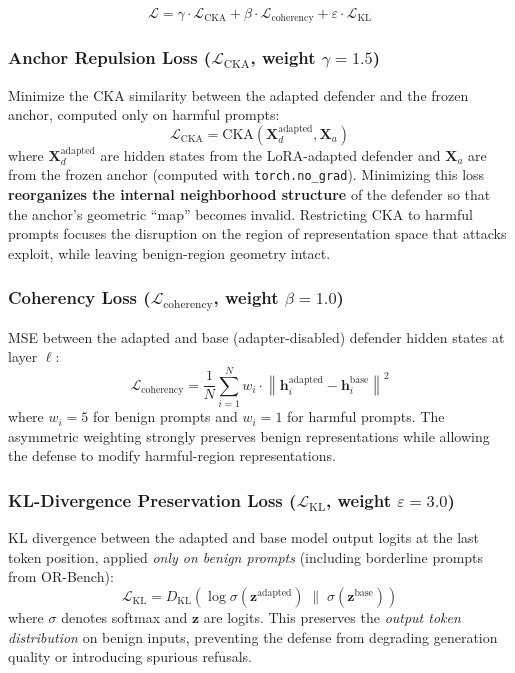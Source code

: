\documentclass[11pt]{article}
\newcommand{\loss}{\mathcal{L}}
\newcommand{\norm}[1]{\left\| #1 \right\|}
\begin{document}
\begin{equation}
    \loss = \gamma \cdot \loss_{\text{CKA}} + \beta \cdot \loss_{\text{coherency}} + \varepsilon \cdot \loss_{\text{KL}}
\end{equation}

\subsubsection{Anchor Repulsion Loss ($\loss_{\text{CKA}}$, weight $\gamma = 1.5$)}

Minimize the CKA similarity between the adapted defender and the frozen anchor, computed only on harmful prompts:
\begin{equation}
    \loss_{\text{CKA}} = \text{CKA}(\mathbf{X}_d^{\text{adapted}}, \mathbf{X}_a)
\end{equation}
where $\mathbf{X}_d^{\text{adapted}}$ are hidden states from the LoRA-adapted defender and $\mathbf{X}_a$ are from the frozen anchor (computed with \texttt{torch.no\_grad}). Minimizing this loss \textbf{reorganizes the internal neighborhood structure} of the defender so that the anchor's geometric ``map'' becomes invalid. Restricting CKA to harmful prompts focuses the disruption on the region of representation space that attacks exploit, while leaving benign-region geometry intact.

\subsubsection{Coherency Loss ($\loss_{\text{coherency}}$, weight $\beta = 1.0$)}

MSE between the adapted and base (adapter-disabled) defender hidden states at layer $\ell$:
\begin{equation}
    \loss_{\text{coherency}} = \frac{1}{N} \sum_{i=1}^{N} w_i \cdot \norm{\mathbf{h}_i^{\text{adapted}} - \mathbf{h}_i^{\text{base}}}^2
\end{equation}
where $w_i = 5$ for benign prompts and $w_i = 1$ for harmful prompts. The asymmetric weighting strongly preserves benign representations while allowing the defense to modify harmful-region representations.

\subsubsection{KL-Divergence Preservation Loss ($\loss_{\text{KL}}$, weight $\varepsilon = 3.0$)}

KL divergence between the adapted and base model output logits at the last token position, applied \emph{only on benign prompts} (including borderline prompts from OR-Bench):
\begin{equation}
    \loss_{\text{KL}} = D_{\text{KL}}\!\left(\log \sigma(\mathbf{z}^{\text{adapted}}) \;\|\; \sigma(\mathbf{z}^{\text{base}})\right)
\end{equation}
where $\sigma$ denotes softmax and $\mathbf{z}$ are logits. This preserves the \emph{output token distribution} on benign inputs, preventing the defense from degrading generation quality or introducing spurious refusals.
\end{document}
